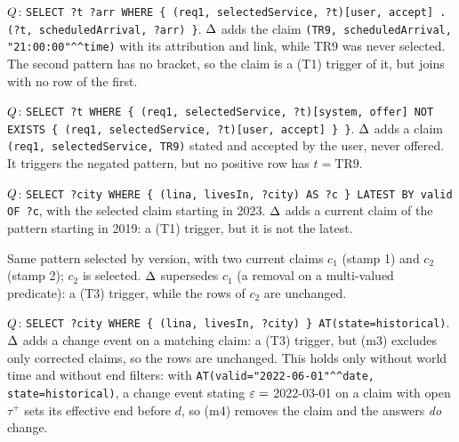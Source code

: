 \begin{example}\label{ex:join}
$Q$: \texttt{SELECT ?t ?arr WHERE \{ (req1, selectedService, ?t)[user, accept] .
(?t, scheduledArrival, ?arr) \}}. $\Delta$ adds the claim \texttt{(TR9, scheduledArrival,
"21:00:00"\textasciicircum\textasciicircum time)} with its attribution and link, while TR9 was
never selected. The second pattern has no bracket, so the claim is a (T1) trigger of it, but joins with no row of the first.
\end{example}

\begin{example}\label{ex:neg}
$Q$: \texttt{SELECT ?t WHERE \{ (req1, selectedService, ?t)[system, offer] NOT EXISTS \{
(req1, selectedService, ?t)[user, accept] \} \}}. $\Delta$ adds a claim
\texttt{(req1, selectedService, TR9)} stated and accepted by the user, never offered. It triggers
the negated pattern, but no positive row has $t=\mathrm{TR9}$.
\end{example}

\begin{example}\label{ex:latest-valid}
$Q$: \texttt{SELECT ?city WHERE \{ (lina, livesIn, ?city) AS ?c \} LATEST BY valid OF ?c}, with
the selected claim starting in 2023. $\Delta$ adds a current claim of the pattern starting in 2019:
a (T1) trigger, but it is not the latest.
\end{example}

\begin{example}\label{ex:latest-version}
Same pattern selected by version, with two current claims $c_1$ (stamp 1) and $c_2$ (stamp 2);
$c_2$ is selected. $\Delta$ supersedes $c_1$ (a removal on a multi-valued predicate): a (T3)
trigger, while the rows of $c_2$ are unchanged.
\end{example}

\begin{example}\label{ex:hist}
$Q$: \texttt{SELECT ?city WHERE \{ (lina, livesIn, ?city) \} AT(state=historical)}. $\Delta$ adds a
change event on a matching claim: a (T3) trigger, but (m3) excludes only corrected claims, so the
rows are unchanged. This holds only without world time and without $\mathrm{end}$ filters: with
\texttt{AT(valid="2022-06-01"\textasciicircum\textasciicircum date, state=historical)}, a change
event stating $\varepsilon=$ 2022-03-01 on a claim with open $\tau^+$ sets its effective end before $d$,
so (m4) removes the claim and the answers \emph{do} change.
\end{example}

